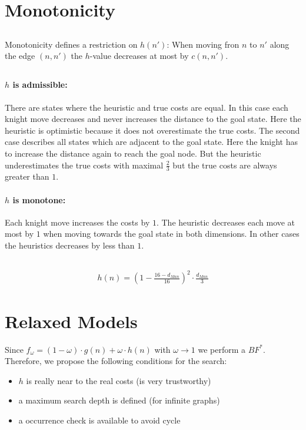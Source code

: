 \documentclass[11pt]{article}
\begin{document}
\section{Monotonicity}
\subsection{}
Monotonicity defines a restriction on $h(n')$: When moving fron $n$ to $n'$ along the edge $(n,n')$ the $h$-value decreases at most by $c(n,n')$. 
\subsection{}
\paragraph{$h$ is admissible:}
There are states where the heuristic and true costs are equal. In this case each knight move decreases and never increases the distance to the goal state. Here the heuristic is optimistic because it does not overestimate the true costs. The second case describes all states which are adjacent to the goal state. Here the knight has to increase the distance again to reach the goal node. But the heuristic underestimates the true costs with maximal $\frac{2}{3}$ but the true costs are always greater than $1$.
\paragraph{$h$ is monotone:}
Each knight move increases the costs by $1$. The heuristic decreases each move at most by $1$ when moving towards the goal state in both dimensions. In other cases the heuristics decreases by less than $1$.  

\setcounter{section}{4}
\subsection{}
\begin{align*}
	h(n)=\left(1-\frac{16-d_{Man}}{16}\right)^2 \cdot \frac{d_{Man}}{3}
\end{align*}
\section{Relaxed Models}
Since $f_\omega = (1-\omega)\cdot g(n) + \omega\cdot h(n)$ with $\omega \rightarrow 1$ we perform a $BF^*$. Therefore, we propose the following conditions for the search:
\begin{itemize}
	\item $h$ is really near to the real costs (is very trustworthy)
	\item a maximum search depth is defined (for infinite graphs)
	\item a occurrence check is available to avoid cycle
\end{itemize}
\end{document}
